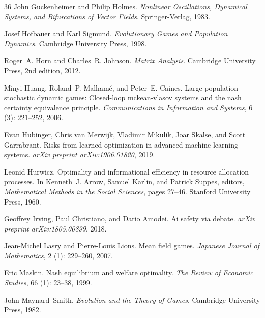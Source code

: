 \documentclass[12pt]{article}
\begin{document}
\begin{thebibliography}{36}
John Guckenheimer and Philip Holmes.
\newblock \emph{Nonlinear Oscillations, Dynamical Systems, and Bifurcations of
  Vector Fields}.
\newblock Springer-Verlag, 1983.

Josef Hofbauer and Karl Sigmund.
\newblock \emph{Evolutionary Games and Population Dynamics}.
\newblock Cambridge University Press, 1998.

Roger~A. Horn and Charles~R. Johnson.
\newblock \emph{Matrix Analysis}.
\newblock Cambridge University Press, 2nd edition, 2012.

Minyi Huang, Roland~P. Malham{\'e}, and Peter~E. Caines.
\newblock Large population stochastic dynamic games: Closed-loop mckean-vlasov
  systems and the nash certainty equivalence principle.
\newblock \emph{Communications in Information and Systems}, 6
  (3): 221--252, 2006.

Evan Hubinger, Chris van Merwijk, Vladimir Mikulik, Joar Skalse, and Scott
  Garrabrant.
\newblock Risks from learned optimization in advanced machine learning systems.
\newblock \emph{arXiv preprint arXiv:1906.01820}, 2019.

Leonid Hurwicz.
\newblock Optimality and informational efficiency in resource allocation
  processes.
\newblock In Kenneth~J. Arrow, Samuel Karlin, and Patrick Suppes, editors,
  \emph{Mathematical Methods in the Social Sciences}, pages 27--46. Stanford
  University Press, 1960.

Geoffrey Irving, Paul Christiano, and Dario Amodei.
\newblock Ai safety via debate.
\newblock \emph{arXiv preprint arXiv:1805.00899}, 2018.

Jean-Michel Lasry and Pierre-Louis Lions.
\newblock Mean field games.
\newblock \emph{Japanese Journal of Mathematics}, 2 (1):
  229--260, 2007.

Eric Maskin.
\newblock Nash equilibrium and welfare optimality.
\newblock \emph{The Review of Economic Studies}, 66 (1):
  23--38, 1999.

John Maynard~Smith.
\newblock \emph{Evolution and the Theory of Games}.
\newblock Cambridge University Press, 1982.


\end{thebibliography}
\end{document}

